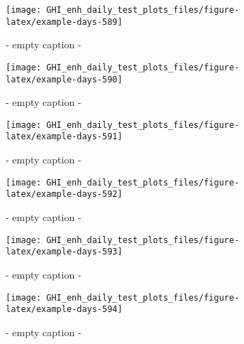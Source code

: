 \documentclass[
  10pt,
  a4paper,oneside]{article}
\begin{document}
\begin{figure}[H]

{\centering \texttt{[image: GHI\_enh\_daily\_test\_plots\_files/figure-latex/example-days-589]} 

}

\caption{ - empty caption - }\label{fig:example-days-589}
\end{figure}

\begin{figure}[H]

{\centering \texttt{[image: GHI\_enh\_daily\_test\_plots\_files/figure-latex/example-days-590]} 

}

\caption{ - empty caption - }\label{fig:example-days-590}
\end{figure}

\begin{figure}[H]

{\centering \texttt{[image: GHI\_enh\_daily\_test\_plots\_files/figure-latex/example-days-591]} 

}

\caption{ - empty caption - }\label{fig:example-days-591}
\end{figure}

\begin{figure}[H]

{\centering \texttt{[image: GHI\_enh\_daily\_test\_plots\_files/figure-latex/example-days-592]} 

}

\caption{ - empty caption - }\label{fig:example-days-592}
\end{figure}

\begin{figure}[H]

{\centering \texttt{[image: GHI\_enh\_daily\_test\_plots\_files/figure-latex/example-days-593]} 

}

\caption{ - empty caption - }\label{fig:example-days-593}
\end{figure}

\begin{figure}[H]

{\centering \texttt{[image: GHI\_enh\_daily\_test\_plots\_files/figure-latex/example-days-594]} 

}

\caption{ - empty caption - }\label{fig:example-days-594}
\end{figure}
\end{document}
